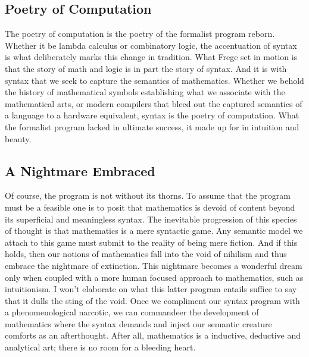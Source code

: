 \documentclass[12pt]{article}
\begin{document}
\subsection{Poetry of Computation}
The poetry of computation is the poetry of the formalist program reborn.
Whether it be lambda calculus or combinatory logic, the accentuation of syntax
is what deliberately marks this change in tradition. What Frege set in motion
is that the story of math and logic is in part the story of syntax. And it is
with syntax that we seek to capture the semantics of mathematics. Whether we
behold the history of mathematical symbols establishing what we associate with
the mathematical arts, or modern compilers that bleed out the captured
semantics of a language to a hardware equivalent, syntax is the poetry of
computation. What the formalist program lacked in ultimate success, it made up
for in intuition and beauty.

\subsection{A Nightmare Embraced}
Of course, the program is not without its thorns. To assume that the program
must be a feasible one is to posit that mathematics is devoid of content beyond
its superficial and meaningless syntax. The inevitable progression of this
species of thought is that mathematics is a mere syntactic game. Any semantic
model we attach to this game must submit to the reality of being mere fiction.
And if this holds, then our notions of mathematics fall into the void of
nihilism and thus embrace the nightmare of extinction. This nightmare becomes a
wonderful dream only when coupled with a more human focused approach to
mathematics, such as intuitionism. I won't elaborate on what this latter
program entails suffice to say that it dulls the sting of the void. Once we
compliment our syntax program with a phenomenological narcotic, we can
commandeer the development of mathematics where the syntax demands and inject
our semantic creature comforts as an afterthought. After all, mathematics is a
inductive, deductive and analytical art; there is no room for a bleeding heart.
\end{document}
